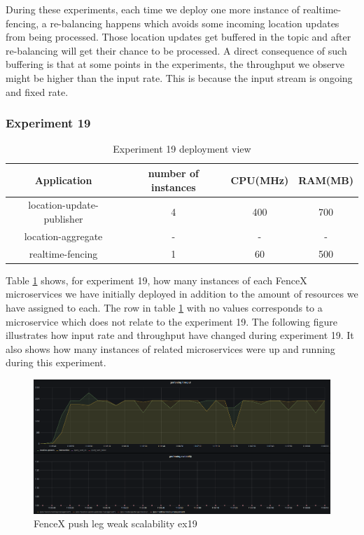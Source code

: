 \documentclass[a4]{report}
\begin{document}
    During these experiments, each time we deploy one more instance of realtime-fencing, a re-balancing happens which
    avoids some incoming location updates from being processed.
    Those location updates get buffered in the topic and after re-balancing will get their chance to be processed.
    A direct consequence of such buffering is that at some points in the experiments, the throughput we observe might be
    higher than the input rate.
    This is because the input stream is ongoing and fixed rate.

    \subsubsection{Experiment 19}
    \begin{table}[h!]
        \centering
        \begin{tabular}{|c|c|c|c|}
            \hline
            Application               & number of instances & CPU(MHz) & RAM(MB) \\
            \hline
            location-update-publisher & 4                   & 400      & 700     \\
            location-aggregate        & -                   & -        & -       \\
            realtime-fencing          & 1                   & 60       & 500     \\
            \hline
        \end{tabular}
        \caption{Experiment 19 deployment view}
        \label{table:ex19-dv}
    \end{table}

    Table \ref{table:ex19-dv} shows, for experiment 19, how many instances of each FenceX microservices we have
    initially deployed in addition to the amount of resources we have assigned to each.
    The row in table \ref{table:ex19-dv} with no values corresponds to a microservice which does not relate to the
    experiment 19.
    The following figure illustrates how input rate and throughput have changed during experiment 19.
    It also shows how many instances of related microservices were up and running during this experiment.

    \begin{figure}
        \caption{FenceX push leg weak scalability ex19}
        \label{fig:ex19}
        \includegraphics[scale=0.5]{images/evaluation/ex19-benchmarking-ongoing-1per16sec.png}
    \end{figure}
\end{document}
